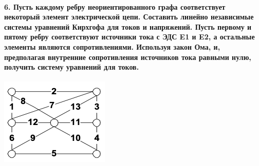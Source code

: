 \documentclass[12pt,a4paper]{article}
\begin{document}
\paragraph*{6. Пусть каждому ребру неориентированного графа соответствует некоторый элемент электрической цепи. Составить линейно независимые системы уравнений Кирхгофа для токов и напряжений. Пусть первому и пятому ребру соответствуют источники тока с ЭДС E1 и E2, а остальные элементы являются сопротивлениями. Используя закон Ома, и, предполагая внутренние сопротивления источников тока равными нулю, получить систему уравнений для токов.}
   \begin{center}
      \includegraphics[scale=0.8]{kirhgof.png}
   \end{center}
\end{document}
